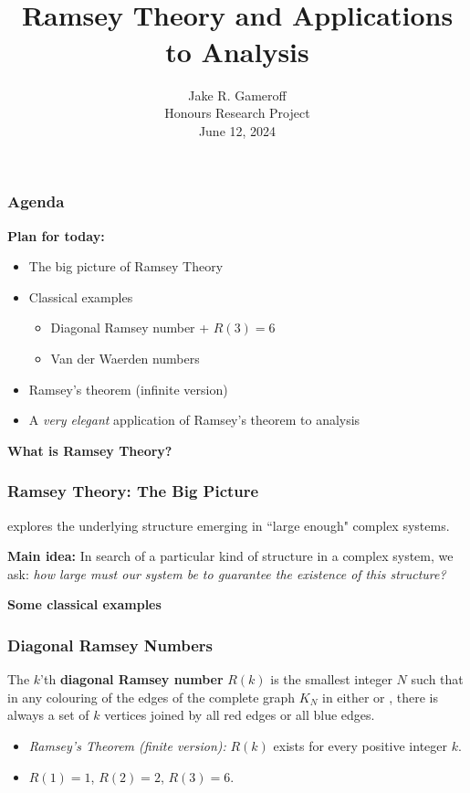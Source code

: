 \documentclass{beamer}
\title{\\ $ $ \\ $ $ \\ $ $ \\ $ $ \\ Ramsey Theory and Applications to Analysis}
\author{Jake R. Gameroff \\ Honours Research Project \\ June 12, 2024}
\date{}
\begin{document}
{
\frame{\titlepage}}

\begin{frame}
\frametitle{Agenda} \textbf{Plan for today:} 
\begin{itemize}
	\item The big picture of Ramsey Theory
	\item Classical examples
		\begin{itemize}
			\item Diagonal Ramsey number + \( R(3)=6 \) 
			\item Van der Waerden numbers
		\end{itemize}
	\item Ramsey's theorem (infinite version)
	\item A \emph{very elegant} application of Ramsey's theorem to analysis
\end{itemize}
\end{frame}

\begin{frame}
\begin{center}
	\Large{\textbf{What is Ramsey Theory?}}
\end{center}
\end{frame}

\begin{frame}
\frametitle{Ramsey Theory: The Big Picture}
{} explores the underlying structure emerging in ``large enough" complex systems.\newline

\textbf{Main idea:} In search of a particular kind of structure in a complex system, we ask: \emph{how large must our system be to guarantee the existence of this structure?}
\end{frame}

\begin{frame}
\begin{center}
	\Large{\textbf{Some classical examples}}
\end{center}
\end{frame}

\begin{frame}
\frametitle{Diagonal Ramsey Numbers} The \( k \)'th \textbf{diagonal Ramsey number} \( R(k) \) is the smallest integer \( N \) such that in any colouring of the edges of the complete graph \( K_{N}  \) in either {\color{red}{red}} or {\color{blue}{blue}}, there is always a set of \( k \) vertices joined by all red edges or all blue edges.
\begin{itemize}
	\item \emph{Ramsey's Theorem (finite version):} \( R(k) \) exists for every positive integer \( k \).
	\item \( R(1) = 1 \), \( R(2) = 2 \), \( R(3) = 6 \).
\end{itemize}
\end{frame}
\end{document}
